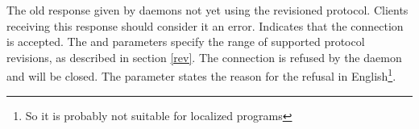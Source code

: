 \documentclass[twoside,a4paper,11pt]{article}
\begin{document}

\noperm

\begin{responses}
  The old response given by daemons not yet using the revisioned
  protocol. Clients receiving this response should consider it an
  error.
  Indicates that the connection is accepted. The  and
   parameters specify the range of supported protocol
  revisions, as described in section \ref{rev}.
  The connection is refused by the daemon and will be closed. The
   parameter states the reason for the refusal in
  English\footnote{So it is probably not suitable for localized
    programs}.
\end{responses}


\end{document}
